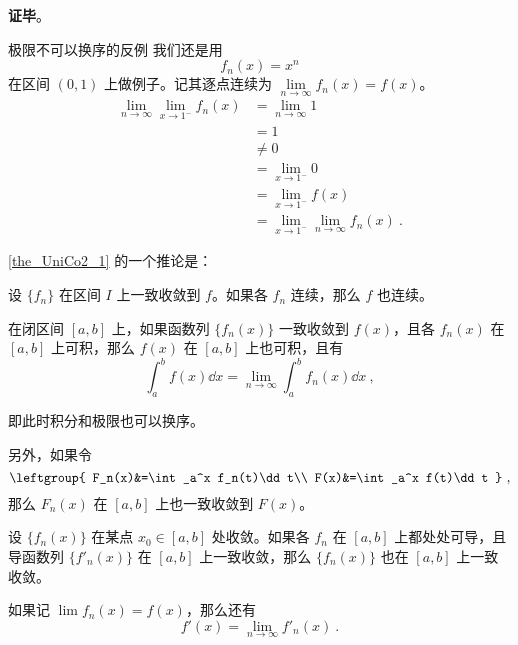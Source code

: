 
\textbf{证毕}。



\begin{example}{极限不可以换序的反例}
我们还是用
\begin{equation}
f_n(x)=x^n
\end{equation}
在区间 $(0, 1)$ 上做例子。记其逐点连续为 $\lim\limits_{n\to\infty}f_n(x)=f(x)$。
\begin{equation}
\begin{aligned}
\lim\limits_{n\to\infty}\lim\limits_{x\to 1^-}f_n(x)&=\lim\limits_{n\to\infty}1\\
&=1\\
&\not=0\\
&=\lim\limits_{x\to 1^-} 0\\
&=\lim\limits_{x\to 1^-}f(x)\\
&=\lim\limits_{x\to 1^-}\lim\limits_{n\to\infty}f_n(x)~.
\end{aligned}
\end{equation}
\end{example}

\autoref{the_UniCo2_1} 的一个推论是：
\begin{corollary}{}
设 $\{f_n\}$ 在区间 $I$ 上一致收敛到 $f$。如果各 $f_n$ 连续，那么 $f$ 也连续。
\end{corollary}

\begin{theorem}{}
在闭区间 $[a, b]$ 上，如果函数列 $\{f_n(x)\}$ 一致收敛到 $f(x)$，且各 $f_n(x)$ 在 $[a, b]$ 上可积，那么 $f(x)$ 在 $[a, b]$ 上也可积，且有
\begin{equation}
\int_a^b f(x) \dd x=\lim_{n\to\infty}\int_a^b f_n(x)\dd x~,
\end{equation}

即此时积分和极限也可以换序。

另外，如果令
\begin{equation}
\leftgroup{
    F_n(x)&=\int_a^x f_n(t)\dd t\\
    F(x)&=\int_a^x f(t)\dd t
}~,
\end{equation}
那么 $F_n(x)$ 在 $[a, b]$ 上也一致收敛到 $F(x)$。

\end{theorem}

\begin{theorem}{}
设 $\{f_n(x)\}$ 在某点 $x_0\in [a, b]$ 处收敛。如果各 $f_n$ 在 $[a, b]$ 上都处处可导，且导函数列 $\{f'_n(x)\}$ 在 $[a, b]$ 上一致收敛，那么 $\{f_n(x)\}$ 也在 $[a, b]$ 上一致收敛。

如果记 $\lim f_n(x)=f(x)$，那么还有
\begin{equation}
f'(x)=\lim\limits_{n\to\infty}f'_n(x)~.
\end{equation}
\end{theorem}

















